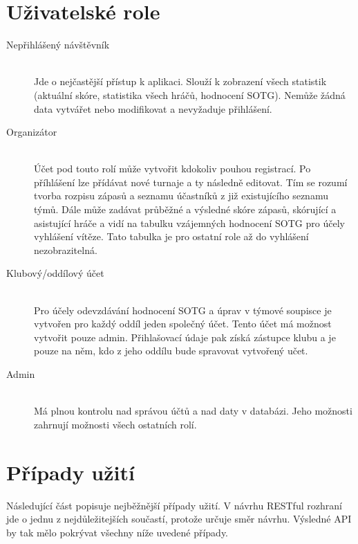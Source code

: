 \documentclass[thesis=B,czech]{FITthesis}[2012/06/26]
\begin{document}
\section{Uživatelské role}


\begin{description}
  \item[Nepřihlášený návštěvník] \hfill \\
  Jde o nejčastější přístup k aplikaci. Slouží k zobrazení všech statistik (aktuální skóre,
  statistika všech hráčů, hodnocení SOTG). Nemůže žádná data vytvářet nebo modifikovat
  a nevyžaduje přihlášení.
  
  \item[Organizátor] \hfill \\
  Účet pod touto rolí může vytvořit kdokoliv pouhou registrací. Po příhlášení lze přídávat
  nové turnaje a ty následně editovat. Tím se rozumí tvorba rozpisu zápasů a seznamu účastníků
  z již existujícího seznamu týmů. Dále může zadávat průběžné a výsledné skóre zápasů,
  skórující a asistující hráče a vidí na tabulku vzájemných hodnocení SOTG pro účely vyhlášení
  vítěze. Tato tabulka je pro ostatní role až do vyhlášení nezobrazitelná.
  
  \item[Klubový/oddílový účet] \hfill \\
  Pro účely odevzdávání hodnocení SOTG a úprav v týmové soupisce je vytvořen pro každý oddíl
  jeden společný účet. Tento účet má možnost vytvořit pouze admin. Přihlašovací údaje pak
  získá zástupce klubu a je pouze na něm, kdo z jeho oddílu bude spravovat vytvořený učet.
  
  \item[Admin] \hfill \\
  Má plnou kontrolu nad správou účtů a nad daty v databázi. Jeho možnosti zahrnují možnosti
  všech ostatních rolí.
\end{description}

\section{Případy užití}

Následující část popisuje nejběžnější případy užití. V návrhu RESTful rozhraní jde
o jednu z nejdůležitejších součastí, protože určuje směr návrhu. Výsledné API by tak mělo
pokrývat všechny níže uvedené případy.
\end{document}
